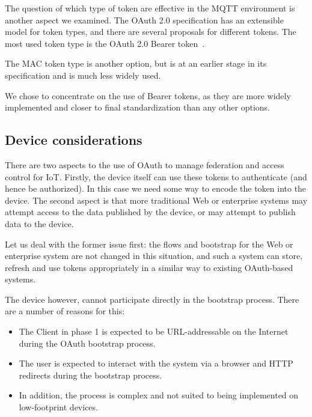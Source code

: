 \documentclass{IEEEtran}
\begin{document}
The question of which type of token are effective in the MQTT environment is another aspect we 
examined. The OAuth 2.0 specification has an extensible model for token types, and there are several
proposals for different tokens. The most used token type is the OAuth 2.0 Bearer token~\cite{oauth2-bearer}.

The MAC token type is another option, but is at an earlier stage in its specification and is much
less widely used. 

We chose to concentrate on the use of Bearer tokens, as they are more widely implemented and 
closer to final standardization than any other options.

\subsection{Device considerations}
There are two aspects to the use of OAuth to manage federation and access control for IoT.
Firstly, the device itself can use these tokens to authenticate (and hence be authorized). In 
this case we need some way to encode the token into the device. The second aspect is that more
traditional Web or enterprise systems may attempt access to the data published by the device, 
or may attempt to publish data to the device.

Let us deal with the former issue first: the flows and bootstrap for the Web or enterprise system
are not changed in this situation, and such a system can store, refresh and use tokens appropriately
in a similar way to existing OAuth-based systems. 

The device however, cannot participate directly in the bootstrap process. There are a number 
of reasons for this:
\begin{itemize} 
\item The Client in phase 1 is expected to be URL-addressable on the Internet during the OAuth 
bootstrap process.
\item The user is expected to interact with the system via a browser and HTTP redirects during 
the bootstrap process.
\item In addition, the process is complex and not suited to being implemented on low-footprint devices.
\end{itemize}
\end{document}
